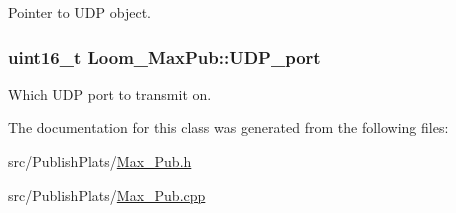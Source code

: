 Pointer to U\+DP object. 

\subsubsection[{\texorpdfstring{U\+D\+P\+\_\+port}{UDP_port}}]{\setlength{\rightskip}{0pt plus 5cm}uint16\+\_\+t Loom\+\_\+\+Max\+Pub\+::\+U\+D\+P\+\_\+port\hspace{0.3cm}{\ttfamily [protected]}}\hypertarget{class_loom___max_pub_aabdb739b93a98972610d836d2f4ace19}{}\label{class_loom___max_pub_aabdb739b93a98972610d836d2f4ace19}


Which U\+DP port to transmit on. 



The documentation for this class was generated from the following files\+:\begin{DoxyCompactItemize}
\item 
src/\+Publish\+Plats/\hyperlink{_max___pub_8h}{Max\+\_\+\+Pub.\+h}\item 
src/\+Publish\+Plats/\hyperlink{_max___pub_8cpp}{Max\+\_\+\+Pub.\+cpp}\end{DoxyCompactItemize}
